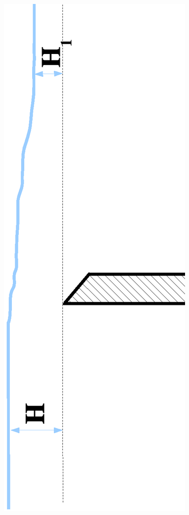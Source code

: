 \begin{figure}[h]
    \begin{center}
     \includegraphics[scale=0.6,angle=270]{Figures/Snoy.eps}
    \end{center}
\end{figure}

